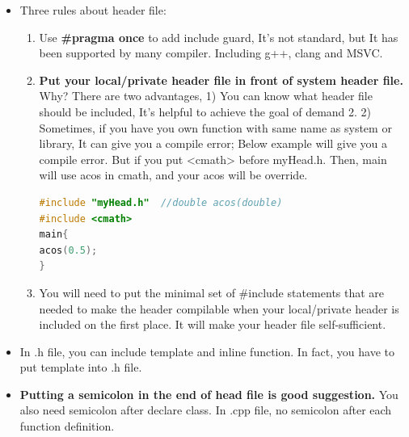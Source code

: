 \documentclass[a4paper,12pt,twoside]{book}
\begin{document}
\begin{itemize}
\item Three rules about header file:

\begin{enumerate}
\item Use \textbf{\#pragma once} to add include guard, It's not standard, but It has been supported by many compiler. Including g++, clang and MSVC.

\item \textbf{Put your local/private header file in front of system header file. }  Why? There are two advantages, 1) You can know what header file should be included, It's helpful to achieve the goal of demand 2.  2) Sometimes, if you have you own function with same name as system or library, It can give you a compile error; Below example will give you a compile error. But if you put <cmath> before myHead.h. Then, main will use acos in cmath, and your acos will be override.

\begin{lstlisting}[frame=single, language=c++]
#include "myHead.h"  //double acos(double)
#include <cmath>
main{
acos(0.5);
}
\end{lstlisting}

\item You will need to put the minimal set of \#include statements that are needed to make the header compilable when your local/private header is included on the first place.  It will make your header file self-sufficient.
\end{enumerate}

\item In .h file, you can include template and inline function.  In fact, you have to put template into .h file. 

\item \textbf{Putting a semicolon in the end of head file is good suggestion.} You also need semicolon after declare class. In .cpp file, no semicolon after each function definition.

\end{itemize}
\end{document}
